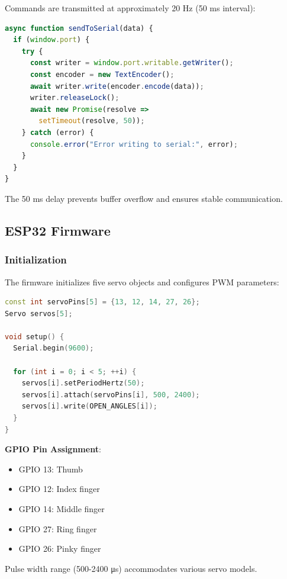 \documentclass[12pt]{article}
\begin{document}
Commands are transmitted at approximately 20 Hz (50 ms interval):

\begin{lstlisting}[language=JavaScript, caption=Serial Data Transmission]
async function sendToSerial(data) {
  if (window.port) {
    try {
      const writer = window.port.writable.getWriter();
      const encoder = new TextEncoder();
      await writer.write(encoder.encode(data));
      writer.releaseLock();
      await new Promise(resolve => 
        setTimeout(resolve, 50));
    } catch (error) {
      console.error("Error writing to serial:", error);
    }
  }
}
\end{lstlisting}

The 50 ms delay prevents buffer overflow and ensures stable communication.

\newpage
\subsection{ESP32 Firmware}

\subsubsection{Initialization}

The firmware initializes five servo objects and configures PWM parameters:

\begin{lstlisting}[language=C++, caption=ESP32 Servo Initialization]
const int servoPins[5] = {13, 12, 14, 27, 26};
Servo servos[5];

void setup() {
  Serial.begin(9600);
  
  for (int i = 0; i < 5; ++i) {
    servos[i].setPeriodHertz(50);
    servos[i].attach(servoPins[i], 500, 2400);
    servos[i].write(OPEN_ANGLES[i]);
  }
}
\end{lstlisting}

\textbf{GPIO Pin Assignment}:
\begin{itemize}
    \item GPIO 13: Thumb
    \item GPIO 12: Index finger
    \item GPIO 14: Middle finger
    \item GPIO 27: Ring finger
    \item GPIO 26: Pinky finger
\end{itemize}

Pulse width range (500-2400 μs) accommodates various servo models.
\end{document}
